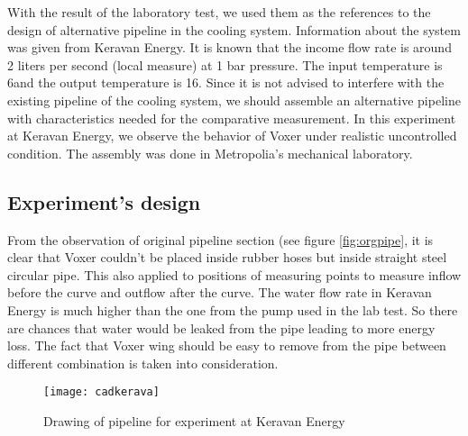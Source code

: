 With the result of the laboratory test, we used them as the references to the design of alternative pipeline in the cooling system. Information about the system was given from Keravan Energy. It is known that the income flow rate is around 2 liters per second (local measure) at 1 bar pressure. The input temperature is 6\celsius  and the output temperature is 16\celsius. 
Since it is not advised to interfere with the existing pipeline of the cooling system, we should assemble an alternative pipeline with characteristics needed for the comparative measurement. In this experiment at Keravan Energy, we observe the behavior of Voxer under realistic uncontrolled condition. The assembly was done in Metropolia's mechanical laboratory.  

\subsection{Experiment's design}

From the observation of original pipeline section (see figure \vref{fig:orgpipe}, it is clear that Voxer couldn't be placed inside rubber hoses but inside straight steel circular pipe. This also applied to positions of measuring points to measure inflow before the curve and outflow after the curve. The water flow rate in Keravan Energy is much higher than the one from the pump used in the lab test. So there are chances that water would be leaked from the pipe leading to more energy loss. The fact that Voxer wing should be easy to remove from the pipe between different combination is taken into consideration.

\begin{figure}[h]
  \centering
  \texttt{[image: cadkerava]}
  \caption{ Drawing of pipeline for experiment at Keravan Energy}
  \label{fig:cadkerava}
\end{figure}


